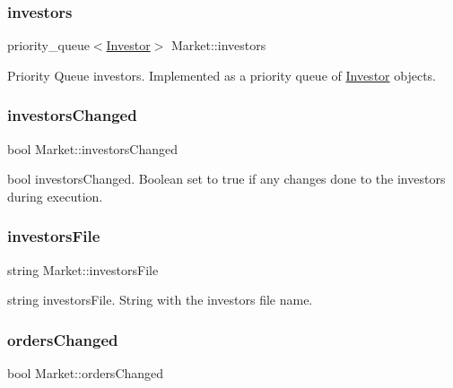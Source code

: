 \subsubsection{\texorpdfstring{investors}{investors}}
{\footnotesize\ttfamily priority\+\_\+queue$<$\hyperlink{class_investor}{Investor}$>$ Market\+::investors\hspace{0.3cm}{\ttfamily [private]}}

Priority Queue investors. Implemented as a priority queue of \hyperlink{class_investor}{Investor} objects. \mbox{\label{class_market_a0b60788b5f378833909924c74d4b23ef}} 
\subsubsection{\texorpdfstring{investors\+Changed}{investorsChanged}}
{\footnotesize\ttfamily bool Market\+::investors\+Changed\hspace{0.3cm}{\ttfamily [private]}}

bool investors\+Changed. Boolean set to true if any changes done to the investors during execution. \mbox{\label{class_market_a50191ccb3c24b3eaf5ad12c7f07959fa}} 
\subsubsection{\texorpdfstring{investors\+File}{investorsFile}}
{\footnotesize\ttfamily string Market\+::investors\+File\hspace{0.3cm}{\ttfamily [private]}}

string investors\+File. String with the investor\textquotesingle{}s file name. \mbox{\label{class_market_a3ce6aa571b7ee3be3a9517110828421f}} 
\subsubsection{\texorpdfstring{orders\+Changed}{ordersChanged}}
{\footnotesize\ttfamily bool Market\+::orders\+Changed\hspace{0.3cm}{\ttfamily [private]}}

